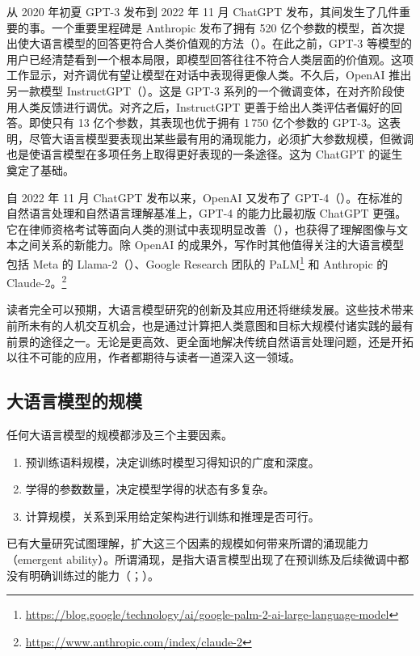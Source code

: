 从 2020 年初夏 GPT-3 发布到 2022 年 11 月 ChatGPT 发布，其间发生了几件重要的事。一个重要里程碑是 Anthropic 发布了拥有 520 亿个参数的模型，首次提出使大语言模型的回答更符合人类价值观的方法（）。在此之前，GPT-3 等模型的用户已经清楚看到一个根本局限，即模型回答往往不符合人类层面的价值观。这项工作显示，对齐调优有望让模型在对话中表现得更像人类。不久后，OpenAI 推出另一款模型 InstructGPT（）。这是 GPT-3 系列的一个微调变体，在对齐阶段使用人类反馈进行调优。对齐之后，InstructGPT 更善于给出人类评估者偏好的回答。即使只有 13 亿个参数，其表现也优于拥有 1\,750 亿个参数的 GPT-3。这表明，尽管大语言模型要表现出某些最有用的涌现能力，必须扩大参数规模，但微调也是使语言模型在多项任务上取得更好表现的一条途径。这为 ChatGPT 的诞生奠定了基础。

自 2022 年 11 月 ChatGPT 发布以来，OpenAI 又发布了 GPT-4（）。在标准的自然语言处理和自然语言理解基准上，GPT-4 的能力比最初版 ChatGPT 更强。它在律师资格考试等面向人类的测试中表现明显改善（），也获得了理解图像与文本之间关系的新能力。除 OpenAI 的成果外，写作时其他值得关注的大语言模型包括 Meta 的 Llama-2（）、Google Research 团队的 PaLM\footnote{\url{https://blog.google/technology/ai/google-palm-2-ai-large-language-model}} 和 Anthropic 的 Claude-2。\footnote{\url{https://www.anthropic.com/index/claude-2}}

读者完全可以预期，大语言模型研究的创新及其应用还将继续发展。这些技术带来前所未有的人机交互机会，也是通过计算把人类意图和目标大规模付诸实践的最有前景的途径之一。无论是更高效、更全面地解决传统自然语言处理问题，还是开拓以往不可能的应用，作者都期待与读者一道深入这一领域。

\subsection{大语言模型的规模}
任何大语言模型的规模都涉及三个主要因素。
\begin{enumerate}
\item 预训练语料规模，决定训练时模型习得知识的广度和深度。
\item 学得的参数数量，决定模型学得的状态有多复杂。
\item 计算规模，关系到采用给定架构进行训练和推理是否可行。
\end{enumerate}
已有大量研究试图理解，扩大这三个因素的规模如何带来所谓的涌现能力（emergent ability）。所谓涌现，是指大语言模型出现了在预训练及后续微调中都没有明确训练过的能力（；）。

